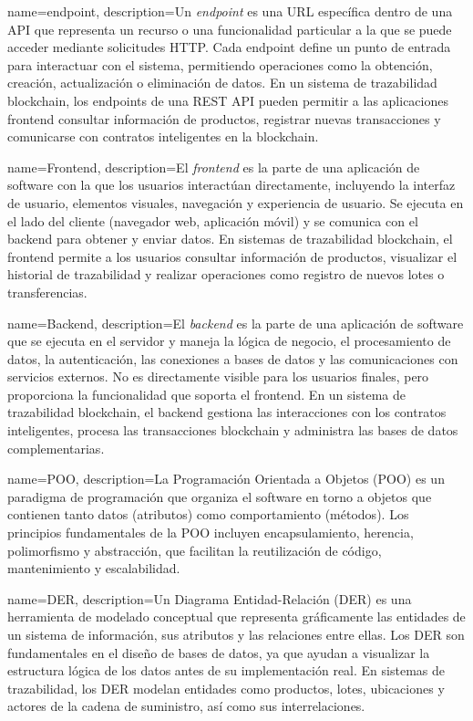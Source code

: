 {
    name=endpoint,
    description={Un \textit{endpoint} es una URL específica dentro de una API que representa un recurso o una funcionalidad particular a la que se puede acceder mediante solicitudes HTTP. Cada endpoint define un punto de entrada para interactuar con el sistema, permitiendo operaciones como la obtención, creación, actualización o eliminación de datos. En un sistema de trazabilidad blockchain, los endpoints de una REST API pueden permitir a las aplicaciones frontend consultar información de productos, registrar nuevas transacciones y comunicarse con contratos inteligentes en la blockchain.}
}


{
    name=Frontend,
    description={El \textit{frontend} es la parte de una aplicación de software con la que los usuarios interactúan directamente, incluyendo la interfaz de usuario, elementos visuales, navegación y experiencia de usuario. Se ejecuta en el lado del cliente (navegador web, aplicación móvil) y se comunica con el backend para obtener y enviar datos. En sistemas de trazabilidad blockchain, el frontend permite a los usuarios consultar información de productos, visualizar el historial de trazabilidad y realizar operaciones como registro de nuevos lotes o transferencias.}
}

{
    name=Backend,
    description={El \textit{backend} es la parte de una aplicación de software que se ejecuta en el servidor y maneja la lógica de negocio, el procesamiento de datos, la autenticación, las conexiones a bases de datos y las comunicaciones con servicios externos. No es directamente visible para los usuarios finales, pero proporciona la funcionalidad que soporta el frontend. En un sistema de trazabilidad blockchain, el backend gestiona las interacciones con los contratos inteligentes, procesa las transacciones blockchain y administra las bases de datos complementarias.}
}

{
    name=POO,
    description={La Programación Orientada a Objetos (POO) es un paradigma de programación que organiza el software en torno a objetos que contienen tanto datos (atributos) como comportamiento (métodos). Los principios fundamentales de la POO incluyen encapsulamiento, herencia, polimorfismo y abstracción, que facilitan la reutilización de código, mantenimiento y escalabilidad.}
}

{
    name=DER,
    description={Un Diagrama Entidad-Relación (DER) es una herramienta de modelado conceptual que representa gráficamente las entidades de un sistema de información, sus atributos y las relaciones entre ellas. Los DER son fundamentales en el diseño de bases de datos, ya que ayudan a visualizar la estructura lógica de los datos antes de su implementación real. En sistemas de trazabilidad, los DER modelan entidades como productos, lotes, ubicaciones y actores de la cadena de suministro, así como sus interrelaciones.}
}

